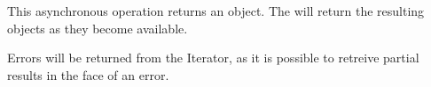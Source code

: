 This asynchronous operation returns an  object.  The
 will return the resulting objects as they become available.

Errors will be returned from the Iterator, as it is possible to retreive partial
results in the face of an error.
